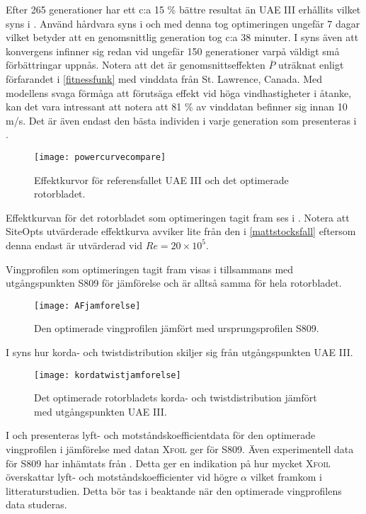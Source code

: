 Efter 265 generationer har ett c:a 15 \% bättre resultat än UAE III erhållits vilket syns i . Använd hårdvara syns i  och med denna tog optimeringen ungefär 7 dagar vilket betyder att en genomsnittlig generation tog c:a 38 minuter. I  syns även att konvergens infinner sig redan vid ungefär 150 generationer varpå väldigt små förbättringar uppnås. Notera att det är genomsnittseffekten $\overline{P}$ uträknat enligt förfarandet i \ref{fitnessfunk} med vinddata från St. Lawrence, Canada. Med modellens svaga förmåga att förutsäga effekt vid höga vindhastigheter i åtanke, kan det vara intressant att notera att 81 \% av vinddatan befinner sig innan 10 m/s. Det är även endast den bästa individen i varje generation som presenteras i .

\begin{figure}[!htb]
  \centering
  \texttt{[image: powercurvecompare]}
  \caption{Effektkurvor för referensfallet UAE III och det optimerade rotorbladet.}
  \label{powercurvecompare}
\end{figure}

Effektkurvan för det rotorbladet som optimeringen tagit fram ses i . Notera att SiteOpts utvärderade effektkurva avviker lite från den i \ref{mattstocksfall} eftersom denna endast är utvärderad vid $Re = 20\times10^5$.

Vingprofilen som optimeringen tagit fram visas i  tillsammans med utgångspunkten S809 för jämförelse och är alltså samma för hela rotorbladet. 

\begin{figure}[!h]
  \centering
  \texttt{[image: AFjamforelse]}
  \caption{Den optimerade vingprofilen jämfört med ursprungsprofilen S809.}
  \label{AFjamforelse}
\end{figure}

I  syns hur korda- och twistdistribution skiljer sig från utgångspunkten UAE III. 

\begin{figure}[!h]
  \centering
  \texttt{[image: kordatwistjamforelse]}
  \caption{Det optimerade rotorbladets korda- och twistdistribution jämfört med utgångspunkten UAE III.}
  \label{kordatwistjamforelse}
\end{figure}

I  och  presenteras lyft- och motståndskoefficientdata för den optimerade vingprofilen i jämförelse med datan \textsc{Xfoil} ger för S809. Även experimentell data för S809 har inhämtats från \citet{s809re20}. Detta ger en indikation på hur mycket \textsc{Xfoil} överskattar lyft- och motståndskoefficienter vid högre $\alpha$ vilket framkom i litteraturstudien. Detta  bör tas i beaktande när den optimerade vingprofilens data studeras.

